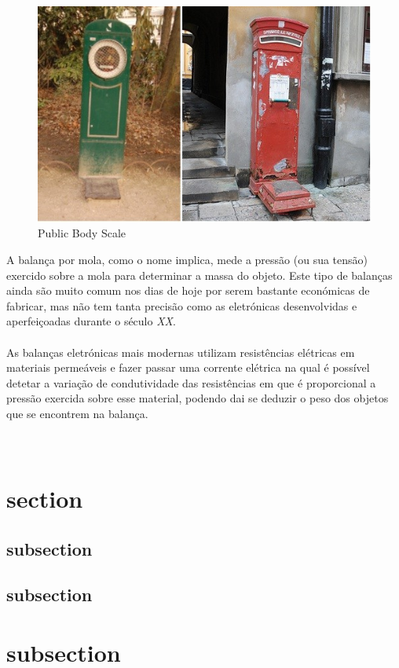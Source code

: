 \begin{figure}[H]
	\centering
	\includegraphics[scale=0.9]{./image/PESTA/general/public_body_scales_1.jpg}
	\caption{Public Body Scale}
	\label{public_body_scale_1}
\end{figure}
A balança por mola, como o nome implica, mede a pressão (ou sua tensão) exercido sobre a mola para determinar a massa do objeto. Este tipo de balanças ainda são muito comum nos dias de hoje por serem bastante económicas de fabricar, mas não tem tanta precisão como as eletrónicas desenvolvidas e aperfeiçoadas durante o século \textit{XX}.
\\
\\
As balanças eletrónicas mais modernas utilizam resistências elétricas em materiais permeáveis e fazer passar uma corrente elétrica na qual é possível detetar a variação de condutividade das resistências em que é proporcional a pressão exercida sobre esse material, podendo dai se deduzir o peso dos objetos que se encontrem na balança.
\\
\\
\\
\section{section}
\subsection{subsection}
\subsection{subsection}
\section{subsection}
